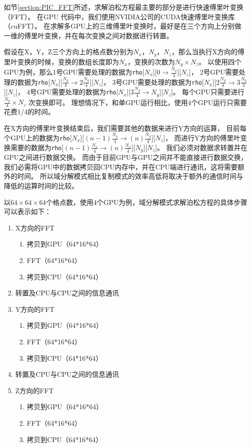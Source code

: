 如节\eqref{section:PIC_FFT}所述，求解泊松方程最主要的部分是进行快速傅里叶变换（FFT）。
在GPU 代码中，我们使用NVIDIA公司的CUDA快速傅里叶变换库（cuFFT）\cite{nvidia2010cufft}。
在求解多GPU上的三维傅里叶变换时，最好是在三个方向上分别做一维的傅里叶变换，并在每次变换之间对数据进行转置。

假设在X，Y，Z三个方向上的格点数分别为$N_x$，$N_y$，$N_z$，那么当执行X方向的傅里叶变换的时候，变换的数组长度即为$N_x$，变换的次数为$N_y \times N_z$。
以使用四个GPU为例，那么1号GPU需要处理的数据为\verb'rho'[$N_x$][$0 \rightarrow \frac{N_y}{4}$][$N_z$]，
2号GPU需要处理的数据为\verb'rho'[$N_x$][$\frac{N_y}{4} \rightarrow 2\frac{N_y}{4}$][$N_z$]，
3号GPU需要处理的数据为\verb'rho'[$N_x$][$2\frac{N_y}{4}\rightarrow 3\frac{N_y}{4}$][$N_z$]，
4号GPU需要处理的数据为\verb'rho'[$N_x$][$3\frac{N_y}{4}\rightarrow N_y$][$N_z$]。
每个GPU只需要进行$\frac{N_y}{4} \times N_z$ 次变换即可。
理想情况下，和单GPU运行相比，使用4个GPU运行只需要花费1/4的时间。

在X方向的傅里叶变换结束后，我们需要其他的数据来进行Y方向的运算，
目前每个GPU上的数据为\verb'rho'[$N_x$][$(n-1)\frac{N_y}{4}\rightarrow (n)\frac{N_y}{4}$][$N_z$]，
而进行Y方向的傅里叶变换需要的数据为\verb'rho'[$(n-1)\frac{N_x}{4}\rightarrow (n)\frac{N_x}{4}$][$N_y$][$N_z$]。
我们必须对数据求转置并在GPU之间进行数据交换。
而由于目前GPU与GPU之间并不能直接进行数据交换，我们必需将GPU中的数据拷贝回CPU内存中，并在CPU端进行通讯，这将需要额外的时间。
所以域分解模式相比复制模式的效率高低将取决于额外的通信时间与降低的运算时间的比较。

以$64 \times 64 \times 64$个格点数，使用4个GPU为例，域分解模式求解泊松方程的具体步骤可以表示如下：
\begin{enumerate}
  \item X方向的FFT
  \begin{enumerate}
    \item 拷贝到GPU（64*16*64）
    \item FFT（64*16*64）
    \item 拷贝到CPU（64*16*64）
  \end{enumerate}
  \item 转置及CPU与CPU之间的信息通讯
  \item Y方向的FFT
  \begin{enumerate}
    \item 拷贝到GPU（64*16*64）
    \item FFT（64*16*64）
    \item 拷贝到CPU（64*16*64）
  \end{enumerate}
  \item 转置及CPU与CPU之间的信息通讯
  \item Z方向的FFT
  \begin{enumerate}
    \item 拷贝到GPU（64*16*64）
    \item FFT（64*16*64）
    \item 拷贝到CPU（64*16*64）
  \end{enumerate}
\end{enumerate}

